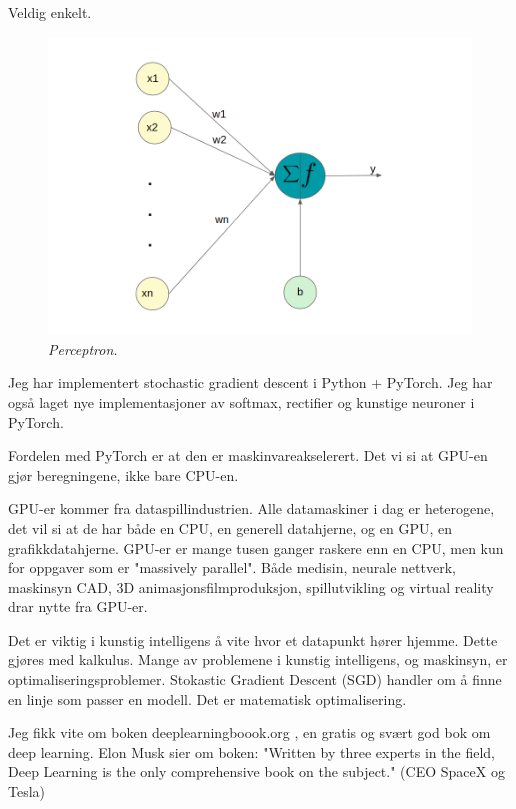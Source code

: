 Veldig enkelt.

\begin{figure} 
\begin{center} 
\includegraphics{figures/perceptron}
\caption{\small \sl Perceptron.\label{fig:perceptron}} 
\end{center} 
\end{figure} 

Jeg har implementert stochastic gradient descent i Python + PyTorch. Jeg har også laget nye implementasjoner av softmax, rectifier og kunstige neuroner i PyTorch.

Fordelen med PyTorch er at den er maskinvareakselerert. Det vi si at GPU-en gjør beregningene, ikke bare CPU-en.

GPU-er kommer fra dataspillindustrien. Alle datamaskiner i dag er heterogene, det vil si at de har både en CPU, en generell datahjerne, og en GPU, en grafikkdatahjerne. GPU-er er mange tusen ganger raskere enn en CPU, men kun for oppgaver som er "massively parallel". Både medisin, neurale nettverk, maskinsyn CAD, 3D animasjonsfilmproduksjon, spillutvikling og virtual reality drar nytte fra GPU-er.

Det er viktig i kunstig intelligens å vite hvor et datapunkt hører hjemme. Dette gjøres med kalkulus. Mange av problemene i kunstig intelligens, og maskinsyn, er optimaliseringsproblemer. Stokastic Gradient Descent (SGD) handler om å finne en linje som passer en modell. Det er matematisk optimalisering.

Jeg fikk vite om boken deeplearningboook.org , en gratis og svært god bok om deep learning. Elon Musk sier om boken: "Written by three experts in the field, Deep Learning is the only comprehensive book on the subject." (CEO SpaceX og Tesla)

